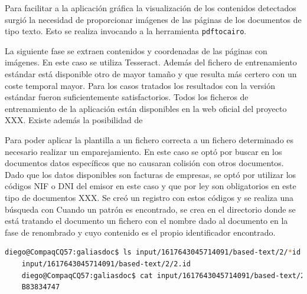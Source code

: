 Para facilitar a la aplicación gráfica la visualización de los contenidos detectados surgió la necesidad de proporcionar imágenes de las páginas de los documentos de tipo texto. Esto se realiza invocando a la herramienta \verb|pdftocairo|. 

La siguiente fase se extraen contenidos y coordenadas de las páginas con imágenes. En este caso se utiliza Tesseract. Además del fichero de entrenamiento estándar está disponible otro de mayor tamaño y que resulta más certero con un coste temporal mayor. Para los casos tratados los resultados con la versión estándar fueron suficientemente satisfactorios. Todos los ficheros de entrenamiento de la aplicación están disponibles en la web oficial del proyecto XXX. Existe además la posibilidad de %


Para poder aplicar la plantilla a un fichero correcta a un fichero determinado es necesario realizar un emparejamiento. En este caso se optó por buscar en los documentos datos específicos que no causaran colisión con otros documentos. Dado que los datos disponibles son facturas de empresas, se optó por utilizar los códigos NIF o DNI del emisor en este caso y que por ley son obligatorios en este tipo de documentos XXX. Se creó un registro con estos códigos y se realiza una búsqueda con %
Cuando un patrón es encontrado, se crea en el directorio donde se está tratando el documento un fichero con el nombre dado al documento en la fase de renombrado y cuyo contenido es el propio identificador encontrado.

\begin{lstlisting}[language=bash,caption={Identificador del documento},label=lst:identificador-documento]
    diego@CompaqCQ57:galiasdoc$ ls input/1617643045714091/based-text/2/*id
    input/1617643045714091/based-text/2/2.id
    diego@CompaqCQ57:galiasdoc$ cat input/1617643045714091/based-text/2/*id
    B83834747
\end{lstlisting}


